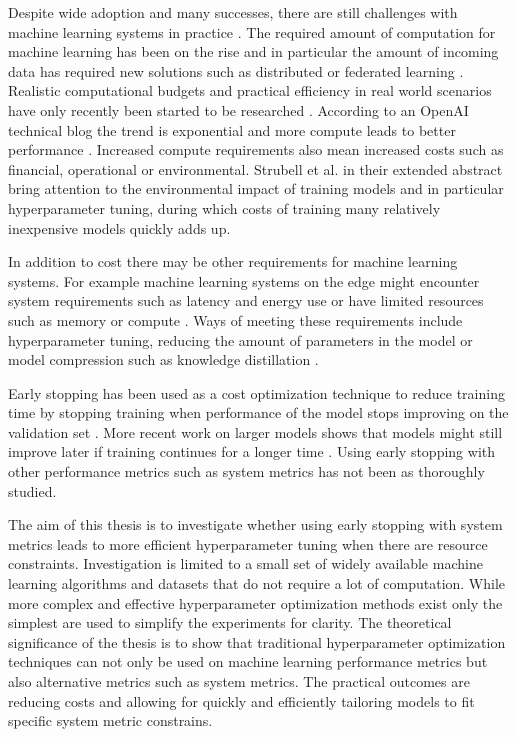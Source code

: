 
Despite wide adoption and many successes, there are still challenges with machine learning systems in practice \parencite{daiAddressingModernPractical2023}. The required amount of computation for machine learning has been on the rise \parencite{sarkerMachineLearningAlgorithms2021} and in particular the amount of incoming data has required new solutions such as distributed or federated learning \parencite{daiAddressingModernPractical2023}. Realistic computational budgets and practical efficiency in real world scenarios have only recently been started to be researched \parencite{prabhuComputationallyBudgetedContinual2023}. According to an OpenAI technical blog the trend is exponential and more compute leads to better performance \parencite{amodeiAICompute2018}. Increased compute requirements also mean increased costs such as financial, operational or environmental. Strubell et al. \parencite*{strubellEnergyPolicyConsiderations2020} in their extended abstract bring attention to the environmental impact of training models and in particular hyperparameter tuning, during which costs of training many relatively inexpensive models quickly adds up.

In addition to cost there may be other requirements for machine learning systems. For example machine learning systems on the edge might encounter system requirements such as latency and energy use or have limited resources such as memory or compute \parencite{chenDeepLearningEdge2019}. Ways of meeting these requirements include hyperparameter tuning, reducing the amount of parameters in the model or model compression such as knowledge distillation \parencite{chenDeepLearningEdge2019}.

Early stopping has been used as a cost optimization technique to reduce training time by stopping training when performance of the model stops improving on the validation set \parencite{precheltAutomaticEarlyStopping1998}. More recent work on larger models shows that models might still improve later if training continues for a longer time \parencite{hofferTrainLongerGeneralize2018}. Using early stopping with other performance metrics such as system metrics has not been as thoroughly studied.


The aim of this thesis is to investigate whether using early stopping with system metrics leads to more efficient hyperparameter tuning when there are resource constraints. Investigation is limited to a small set of widely available machine learning algorithms and datasets that do not require a lot of computation. While more complex and effective hyperparameter optimization methods exist only the simplest are used to simplify the experiments for clarity. The theoretical significance of the thesis is to show that traditional hyperparameter optimization techniques can not only be used on machine learning performance metrics but also alternative metrics such as system metrics. The practical outcomes are reducing costs and allowing for quickly and efficiently tailoring models to fit specific system metric constrains.


